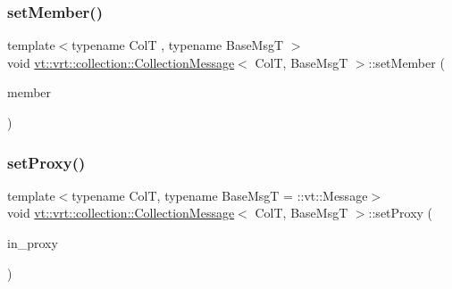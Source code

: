 \mbox{\label{structvt_1_1vrt_1_1collection_1_1_collection_message_a7ab28aae693beb9ffea7eed409fe3ccf}} 
\subsubsection{\texorpdfstring{set\+Member()}{setMember()}}
{\footnotesize\ttfamily template$<$typename ColT , typename Base\+MsgT $>$ \\
void \hyperlink{structvt_1_1vrt_1_1collection_1_1_collection_message}{vt\+::vrt\+::collection\+::\+Collection\+Message}$<$ ColT, Base\+MsgT $>$\+::set\+Member (\begin{DoxyParamCaption}\item[{bool const \&}]{member }\end{DoxyParamCaption})}

\mbox{\label{structvt_1_1vrt_1_1collection_1_1_collection_message_a38349a148d8dbcab2a4a54efa2089e1c}} 
\subsubsection{\texorpdfstring{set\+Proxy()}{setProxy()}}
{\footnotesize\ttfamily template$<$typename ColT, typename Base\+MsgT = \+::vt\+::\+Message$>$ \\
void \hyperlink{structvt_1_1vrt_1_1collection_1_1_collection_message}{vt\+::vrt\+::collection\+::\+Collection\+Message}$<$ ColT, Base\+MsgT $>$\+::set\+Proxy (\begin{DoxyParamCaption}\item[{\hyperlink{namespacevt_1_1vrt_a620a5c8c59d13e513f690c74b4af516f}{Virtual\+Elm\+Proxy\+Type}$<$ ColT, \hyperlink{structvt_1_1vrt_1_1collection_1_1_collection_message_a324978c38e67d1bfa86c8db172e77594}{Index\+Type} $>$ const \&}]{in\+\_\+proxy }\end{DoxyParamCaption})}

